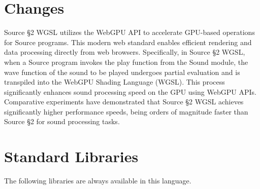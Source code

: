 





\section{Changes}

Source \S 2 WGSL utilizes the WebGPU API to accelerate GPU-based operations for Source programs. 
This modern web standard enables efficient rendering and data processing directly from web browsers. 
Specifically, in Source \S 2 WGSL, when a Source program invokes the play function from the Sound module, 
the wave function of the sound to be played undergoes partial evaluation and is transpiled into the WebGPU Shading Language (WGSL). 
This process significantly enhances sound processing speed on the GPU using WebGPU APIs. 
Comparative experiments have demonstrated that Source \S 2 WGSL achieves significantly higher performance speeds, 
being orders of magnitude faster than Source \S 2 for sound processing tasks.





\newpage

















\section{Standard Libraries}

The following libraries are always available in this language.











\newpage



